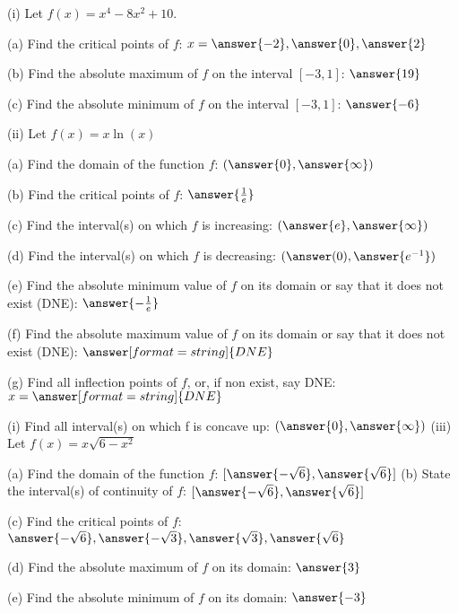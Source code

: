 \documentclass{ximera}
\begin{document}
\begin{exercise}
(i) Let $f(x)=x^4-8x^2+10$. 

(a) Find the critical points of $f$: $x=\answer{-2},\answer{0},\answer{2}$

(b) Find the absolute maximum of $f$ on the interval $[-3,1]$: $\answer{19}$

(c) Find the absolute minimum of $f$ on the interval $[-3,1]$: $\answer{-6}$

(ii) Let $f(x)=x\ln(x)$

(a) Find the domain of the function $f$: $(\answer{0},\answer{\infty})$

(b) Find the critical points of $f$: $\answer{\frac{1}{e}}$

(c) Find the interval(s) on which $f$ is increasing: $(\answer{e},\answer{\infty})$

(d) Find the interval(s) on which $f$ is decreasing: $(\answer(0),\answer{e^{-1}})$

(e) Find the absolute minimum value of $f$ on its domain or say that it does not exist (DNE): $\answer{-\frac{1}{e}}$

(f) Find the absolute maximum value of $f$ on its domain or say that it does not exist (DNE): $\answer[format=string]{DNE}$

(g) Find all inflection points of $f$, or, if non exist, say DNE: $x=\answer[format=string]{DNE}$

(i) Find all interval(s) on which f is concave up: $(\answer{0},\answer{\infty})$
(iii) Let $f(x)=x\sqrt{6-x^2}$

(a) Find the domain of the function $f$: $[\answer{-\sqrt{6}},\answer{\sqrt{6}}]$
(b) State the interval(s) of continuity of $f$: $[\answer{-\sqrt{6}},\answer{\sqrt{6}}]$

(c) Find the critical points of $f$: $\answer{-\sqrt{6}},\answer{-\sqrt{3}},\answer{\sqrt{3}}, \answer{\sqrt{6}}$

(d) Find the absolute maximum of $f$ on its domain: $\answer{3}$

(e) Find the absolute minimum of $f$ on its domain: $\answer{-3}$
\end{exercise}
\end{document}
